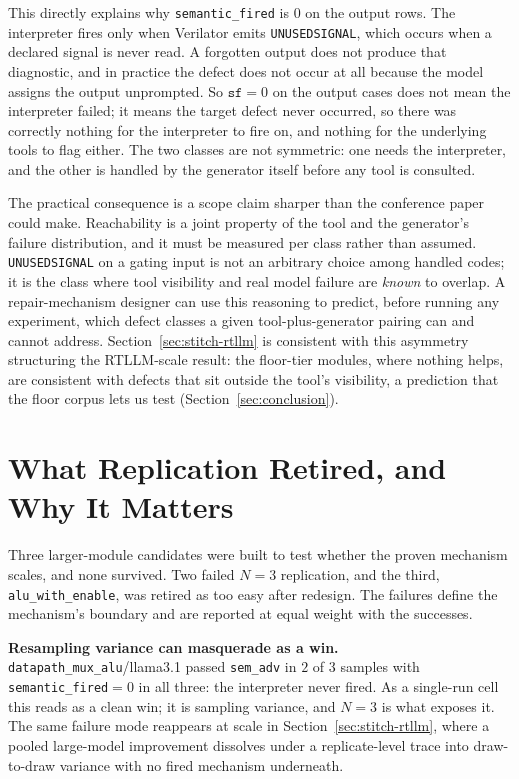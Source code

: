 \documentclass[11pt]{article}
\begin{document}
This directly explains why \texttt{semantic\_fired} is $0$ on the output rows.
The interpreter fires only when Verilator emits \texttt{UNUSEDSIGNAL}, which
occurs when a declared signal is never read. A forgotten output does not
produce that diagnostic, and in practice the defect does not occur at all
because the model assigns the output unprompted. So $\texttt{sf}{=}0$ on the
output cases does not mean the interpreter failed; it means the target defect
never occurred, so there was correctly nothing for the interpreter to fire on,
and nothing for the underlying tools to flag either. The two classes are not
symmetric: one needs the interpreter, and the other is handled by the
generator itself before any tool is consulted.

The practical consequence is a scope claim sharper than the conference paper
could make. Reachability is a joint property of the tool and the generator's
failure distribution, and it must be measured per class rather than assumed.
\texttt{UNUSEDSIGNAL} on a gating input is not an arbitrary choice among
handled codes; it is the class where tool visibility and real model failure
are \emph{known} to overlap. A repair-mechanism designer can use this
reasoning to predict, before running any experiment, which defect classes a
given tool-plus-generator pairing can and cannot address.
Section~\ref{sec:stitch-rtllm} is consistent with this asymmetry structuring
the RTLLM-scale result: the floor-tier modules, where nothing helps, are
consistent with defects that sit outside the tool's visibility, a prediction
that the floor corpus lets us test (Section~\ref{sec:conclusion}).

\section{What Replication Retired, and Why It Matters}
\label{sec:retire}

Three larger-module candidates were built to test whether the proven mechanism
scales, and none survived. Two failed $N{=}3$ replication, and the third,
\texttt{alu\_with\_enable}, was retired as too easy after redesign. The
failures define the mechanism's boundary and are reported at equal weight with
the successes.

\textbf{Resampling variance can masquerade as a win.}
\texttt{datapath\_mux\_alu}/llama3.1 passed \texttt{sem\_adv} in $2$ of $3$
samples with \texttt{semantic\_fired}${=}0$ in all three: the interpreter
never fired. As a single-run cell this reads as a clean win; it is sampling
variance, and $N{=}3$ is what exposes it. The same failure mode reappears at
scale in Section~\ref{sec:stitch-rtllm}, where a pooled large-model
improvement dissolves under a replicate-level trace into draw-to-draw variance
with no fired mechanism underneath.
\end{document}
